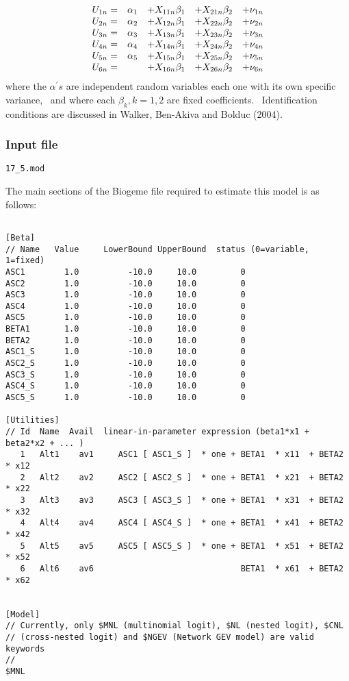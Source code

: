 \documentclass[12pt]{memoir}
\begin{document}
\begin{equation}%
\begin{array}
[c]{ccccc}%
U_{1n}= & \alpha_{1} & +X_{11n}\beta_{1} & +X_{21n}\beta_{2} & +\nu_{1n}\\
U_{2n}= & \alpha_{2} & +X_{12n}\beta_{1} & +X_{22n}\beta_{2} & +\nu_{2n}\\
U_{3n}= & \alpha_{3} & +X_{13n}\beta_{1} & +X_{23n}\beta_{2} & +\nu_{3n}\\
U_{4n}= & \alpha_{4} & +X_{14n}\beta_{1} & +X_{24n}\beta_{2} & +\nu_{4n}\\
U_{5n}= & \alpha_{5} & +X_{15n}\beta_{1} & +X_{25n}\beta_{2} & +\nu_{5n}\\
U_{6n}= &  & +X_{16n}\beta_{1} & +X_{26n}\beta_{2} & +\nu_{6n}%
\end{array}
\end{equation}
where the $\alpha^{\prime}s$ are independent random variables each one with
its own specific variance, \ and where each $\beta_{k},k=1,2$ are fixed
coefficients. \ Identification conditions are discussed in Walker, Ben-Akiva
and Bolduc (2004). \ 

\subsubsection{Input file}

\begin{flushright}
  \verb+17_5.mod+
\end{flushright}
The main sections of the Biogeme file required to estimate this model is as follows:
\tiny
{\footnotesize
\begin{verbatim}
 
[Beta]
// Name   Value     LowerBound UpperBound  status (0=variable, 1=fixed)
ASC1        1.0          -10.0     10.0         0
ASC2        1.0          -10.0     10.0         0
ASC3        1.0          -10.0     10.0         0
ASC4        1.0          -10.0     10.0         0
ASC5        1.0          -10.0     10.0         0
BETA1       1.0          -10.0     10.0         0
BETA2       1.0          -10.0     10.0         0
ASC1_S      1.0          -10.0     10.0         0
ASC2_S      1.0          -10.0     10.0         0
ASC3_S      1.0          -10.0     10.0         0
ASC4_S      1.0          -10.0     10.0         0
ASC5_S      1.0          -10.0     10.0         0
 
[Utilities]
// Id  Name  Avail  linear-in-parameter expression (beta1*x1 + beta2*x2 + ... )
   1   Alt1    av1     ASC1 [ ASC1_S ]  * one + BETA1  * x11  + BETA2  * x12 
   2   Alt2    av2     ASC2 [ ASC2_S ]  * one + BETA1  * x21  + BETA2  * x22 
   3   Alt3    av3     ASC3 [ ASC3_S ]  * one + BETA1  * x31  + BETA2  * x32 
   4   Alt4    av4     ASC4 [ ASC4_S ]  * one + BETA1  * x41  + BETA2  * x42 
   5   Alt5    av5     ASC5 [ ASC5_S ]  * one + BETA1  * x51  + BETA2  * x52 
   6   Alt6    av6                              BETA1  * x61  + BETA2  * x62   
 
 
[Model]
// Currently, only $MNL (multinomial logit), $NL (nested logit), $CNL
// (cross-nested logit) and $NGEV (Network GEV model) are valid keywords
//
$MNL
 
\end{verbatim}
}
\normalsize
\end{document}
